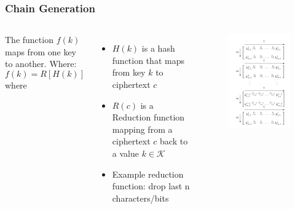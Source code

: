 \documentclass{beamer}
\newenvironment{where}{\noindent{}where\begin{itemize}}{\end{itemize}}
\begin{document}
\begin{frame}
\frametitle{Chain Generation}
\begin{columns}[c]
The function $f(k)$ maps from one key to another. Where:
\begin{equation*}
f(k) = R[H(k)]
\end{equation*}
\begin{where}
\item $H(k)$ is a hash function that maps from key $k$ to ciphertext $c$
\item $R(c)$ is a Reduction function mapping from a ciphertext $c$ back to a value $k \in \mathcal{K}$
\item Example reduction function: drop last n characters/bits
\end{where}
\begin{figure}
\includegraphics[width=0.9\linewidth]{figs/classic}
\end{figure}
\end{columns}
\end{frame}
\end{document}
